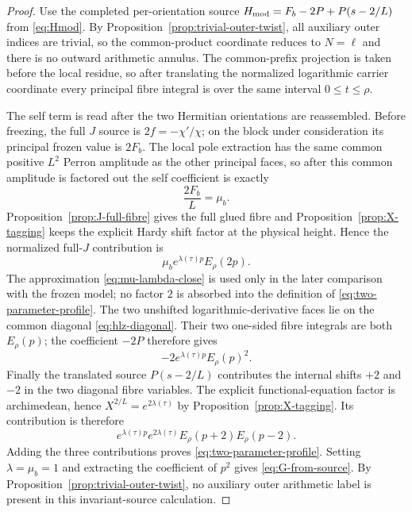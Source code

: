 \begin{proof}
Use the completed per-orientation source
$H_{\rm mod}=F_b-2P+P(s-2/L)$ from \eqref{eq:Hmod}. By
Proposition~\ref{prop:trivial-outer-twist}, all auxiliary outer indices are
trivial, so the common-product coordinate reduces to $N=\ell$ and there is no
outward arithmetic annulus.
The common-prefix projection is taken before the local residue, so after
translating the normalized logarithmic carrier coordinate every principal fibre
integral is over the same interval $0\le t\le\rho$.

The self term is read after the two Hermitian orientations are reassembled.
Before freezing, the full $J$ source is $2f=-\chi'/\chi$; on the block under
consideration its principal frozen value is $2F_b$. The local pole extraction
has the same common positive $L^2$ Perron amplitude as the other principal
faces, so after this common amplitude is factored out the self coefficient is
exactly
\[
\frac{2F_b}{L}=\mu_b.
\]
Proposition~\ref{prop:J-full-fibre} gives the full glued fibre and
Proposition~\ref{prop:X-tagging} keeps the explicit Hardy shift factor at the
physical height. Hence the normalized full-$J$ contribution is
\[
\mu_b e^{\lambda(\tau)p}E_\rho(2p).
\]
The approximation \eqref{eq:mu-lambda-close} is used only in the later
comparison with the frozen model; no factor $2$ is absorbed into the definition
of \eqref{eq:two-parameter-profile}.
The two unshifted logarithmic-derivative faces lie on the common diagonal
\eqref{eq:hlz-diagonal}. Their two one-sided fibre integrals are both
$E_\rho(p)$; the coefficient $-2P$ therefore gives
\[
-2e^{\lambda(\tau)p}E_\rho(p)^2.
\]
Finally the translated source $P(s-2/L)$ contributes the internal shifts
$+2$ and $-2$ in the two diagonal fibre variables. The explicit
functional-equation factor is archimedean, hence
$X^{2/L}=e^{2\lambda(\tau)}$ by Proposition~\ref{prop:X-tagging}. Its
contribution is therefore
\[
e^{\lambda(\tau)p}e^{2\lambda(\tau)}
E_\rho(p+2)E_\rho(p-2).
\]
Adding the three contributions proves
\eqref{eq:two-parameter-profile}. Setting $\lambda=\mu_b=1$ and extracting the
coefficient of $p^2$ gives \eqref{eq:G-from-source}. By
Proposition~\ref{prop:trivial-outer-twist}, no auxiliary outer arithmetic label
is present in this invariant-source calculation.
\end{proof}

